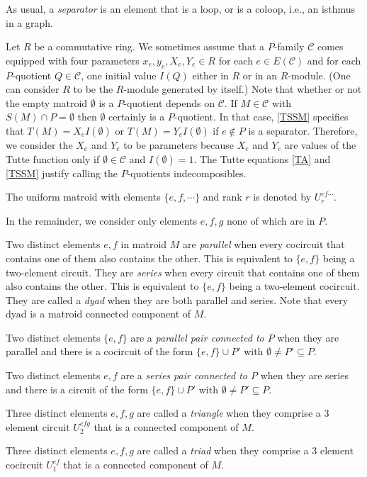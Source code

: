 \documentclass[12pt,leqno]{amsart}
\theoremstyle{remark}
\begin{document}
As usual, a \emph{separator} is an element that is a loop,  or is
a coloop, i.e., an isthmus in a graph.


Let $R$ be a commutative ring.
We sometimes assume that a $P$-family $\mathcal{C}$ comes equipped
with four parameters $x_e,y_e,X_e,Y_e\in R$ for each 
$e\in E(\mathcal{C})$ and for each $P$-quotient $Q\in\mathcal{C}$,
one initial value $I(Q)$ either in $R$ 
or in an $R$-module.  (One can consider $R$ to be
the $R$-module generated by itself.)
Note that whether or
not the empty matroid $\emptyset$ is a $P$-quotient depends on
$\mathcal{C}$.  If $M\in\mathcal{C}$ with
$S(M)\cap P=\emptyset$ then $\emptyset$ certainly is a $P$-quotient.
In that case, \eqref{TSSM} specifies that $T(M) = X_e I(\emptyset)$
or $T(M) =Y_e I(\emptyset)$ if $e\not\in P$ is a separator.
Therefore,
we consider the $X_e$ and $Y_e$ to be parameters
because $X_e$ and $Y_e$ are values of the Tutte function
only if $\emptyset\in \mathcal{C}$ and $I(\emptyset)=1$.
The Tutte equations \eqref{TA} and \eqref{TSSM}
justify calling the $P$-quotients indecomposibles.

The uniform matroid with elements $\{e, f, \cdots \}$ and rank $r$ is denoted
by $U^{ef\cdots}_r$.

In the remainder, we consider only elements $e, f, g$ none of 
which are in $P$.

Two distinct elements $e,f$ in matroid $M$
are \emph{parallel} when
every cocircuit that contains one of them also contains the other.  This
is equivalent to $\{e, f\}$ being a two-element circuit.
They are \emph{series} when every circuit that contains one of them
also contains the other.  This is equivalent to $\{e, f\}$ being a two-element
cocircuit.
They are called a \emph{dyad} when 
they are both parallel and series.  Note that every 
dyad is a matroid connected
component of $M$.

Two distinct elements $\{e,f\}$  are a \emph{parallel pair connected
to $P$} when they are parallel and there is a cocircuit of the form
$\{e,f\}\cup P'$ with $\emptyset\neq P'\subseteq P$.

Two distinct elements $e,f$ are a \emph{series pair connected
to $P$} when they are series and there is a circuit of the form
$\{e,f\}\cup P'$ with $\emptyset\neq P'\subseteq P$.

Three distinct elements $e,f,g$ are called a \emph{triangle}
when they comprise a 3 element circuit $U_2^{efg}$ that is a 
connected component of $M$.

Three distinct elements $e,f,g$ are called a \emph{triad}
when they comprise a 3 element cocircuit $U_1^{ef}$ that is a 
connected component of $M$.
\end{document}
